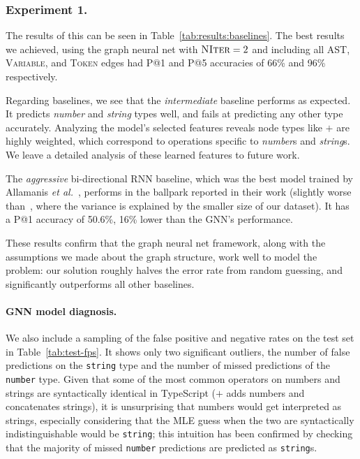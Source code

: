 \subsubsection{Experiment 1.}
The results of this can be seen in Table~\ref{tab:results:baselines}.
The best results we achieved, using the graph neural net with $\textsc{NIter}=2$ and including all AST, \textsc{Variable}, and \textsc{Token} edges had P@1 and P@5 accuracies of 66\% and 96\% respectively.

Regarding baselines, we see that the \textit{intermediate} baseline performs as expected.
It predicts \textit{number} and \textit{string} types well, and fails at predicting any other type accurately.
Analyzing the model's selected features reveals node types like $+$ are highly weighted, which correspond to operations specific to \textit{number}s and \textit{string}s.
We leave a detailed analysis of these learned features to future work.

The \textit{aggressive} bi-directional RNN baseline, which was the best model trained by Allamanis \textit{et al.}~\cite{hellendoorn2018deep}, performs in the ballpark reported in their work (slightly worse than~\cite{hellendoorn2018deep}, where the variance is explained by the smaller size of our dataset).
It has a P@1 accuracy of 50.6\%, 16\% lower than the GNN's performance.

These results confirm that the graph neural net framework, along with the assumptions we made about the graph structure, work well to model the problem: our solution roughly halves the error rate from random guessing, and significantly outperforms all other baselines.

\paragraph{GNN model diagnosis.}
We also include a sampling of the false positive and negative rates on the test set in Table~\ref{tab:test-fps}.
It shows only two significant outliers, the number of false predictions on the \texttt{string} type and the number of missed predictions of the \texttt{number} type.
Given that some of the most common operators on numbers and strings are syntactically identical in TypeScript ($+$ adds numbers and concatenates strings), it is unsurprising that numbers would get interpreted as strings, especially considering that the MLE guess when the two are syntactically indistinguishable would be \texttt{string}; this intuition has been confirmed by checking that the majority of missed \texttt{number} predictions are predicted as \texttt{string}s.

